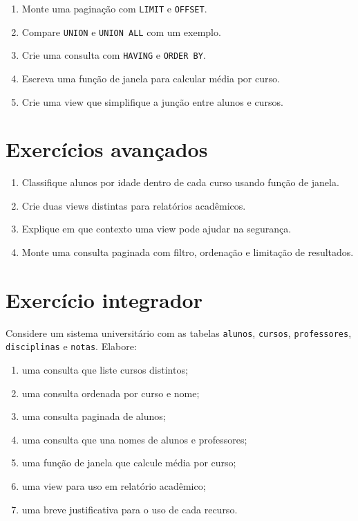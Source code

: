 \begin{enumerate}
    \item Monte uma paginação com \texttt{LIMIT} e \texttt{OFFSET}.
    \item Compare \texttt{UNION} e \texttt{UNION ALL} com um exemplo.
    \item Crie uma consulta com \texttt{HAVING} e \texttt{ORDER BY}.
    \item Escreva uma função de janela para calcular média por curso.
    \item Crie uma view que simplifique a junção entre alunos e cursos.
\end{enumerate}

\section{Exercícios avançados}

\begin{enumerate}
    \item Classifique alunos por idade dentro de cada curso usando função de janela.
    \item Crie duas views distintas para relatórios acadêmicos.
    \item Explique em que contexto uma view pode ajudar na segurança.
    \item Monte uma consulta paginada com filtro, ordenação e limitação de resultados.
\end{enumerate}

\section{Exercício integrador}

Considere um sistema universitário com as tabelas \texttt{alunos}, \texttt{cursos}, \texttt{professores}, \texttt{disciplinas} e \texttt{notas}. Elabore:

\begin{enumerate}
    \item uma consulta que liste cursos distintos;
    \item uma consulta ordenada por curso e nome;
    \item uma consulta paginada de alunos;
    \item uma consulta que una nomes de alunos e professores;
    \item uma função de janela que calcule média por curso;
    \item uma view para uso em relatório acadêmico;
    \item uma breve justificativa para o uso de cada recurso.
\end{enumerate}

